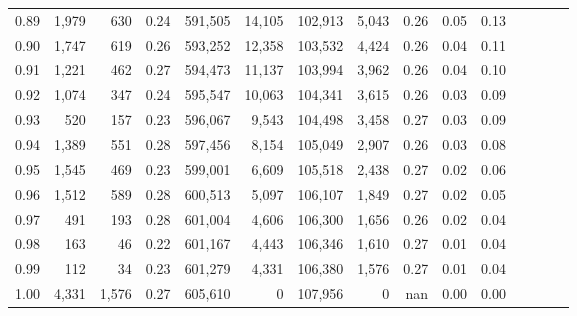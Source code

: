 \begin{tabular}{rrrcrrrrrrrrrrr}
0.89 &   1,979 &    630 &                                       0.24 &  591,505 &   14,105 &  102,913 &    5,043 &  0.26 &  0.05 &                         0.13 \\
0.90 &   1,747 &    619 &                                       0.26 &  593,252 &   12,358 &  103,532 &    4,424 &  0.26 &  0.04 &                         0.11 \\
0.91 &   1,221 &    462 &                                       0.27 &  594,473 &   11,137 &  103,994 &    3,962 &  0.26 &  0.04 &                         0.10 \\
0.92 &   1,074 &    347 &                                       0.24 &  595,547 &   10,063 &  104,341 &    3,615 &  0.26 &  0.03 &                         0.09 \\
0.93 &     520 &    157 &                                       0.23 &  596,067 &    9,543 &  104,498 &    3,458 &  0.27 &  0.03 &                         0.09 \\
0.94 &   1,389 &    551 &                                       0.28 &  597,456 &    8,154 &  105,049 &    2,907 &  0.26 &  0.03 &                         0.08 \\
0.95 &   1,545 &    469 &                                       0.23 &  599,001 &    6,609 &  105,518 &    2,438 &  0.27 &  0.02 &                         0.06 \\
0.96 &   1,512 &    589 &                                       0.28 &  600,513 &    5,097 &  106,107 &    1,849 &  0.27 &  0.02 &                         0.05 \\
0.97 &     491 &    193 &                                       0.28 &  601,004 &    4,606 &  106,300 &    1,656 &  0.26 &  0.02 &                         0.04 \\
0.98 &     163 &     46 &                                       0.22 &  601,167 &    4,443 &  106,346 &    1,610 &  0.27 &  0.01 &                         0.04 \\
0.99 &     112 &     34 &                                       0.23 &  601,279 &    4,331 &  106,380 &    1,576 &  0.27 &  0.01 &                         0.04 \\
1.00 &   4,331 &  1,576 &                                       0.27 &  605,610 &        0 &  107,956 &        0 &   nan &  0.00 &                         0.00 \\
\bottomrule
\end{tabular}
